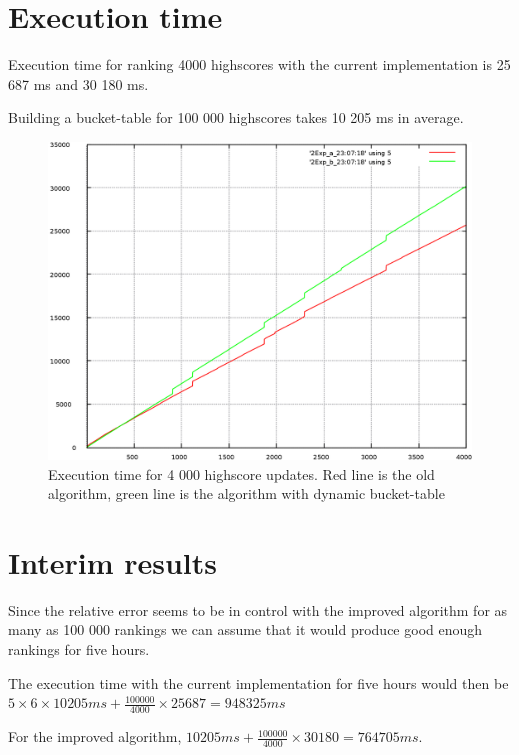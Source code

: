 \section{Execution time}

Execution time for ranking 4000 highscores with the current implementation is 25 687 ms and 30 180 ms. 

Building a bucket-table for 100 000 highscores takes 10 205 ms in average. 

\begin{figure}[h!]
  \centering
  \caption{Execution time for 4 000 highscore updates. Red line is the old algorithm, green line is the algorithm with dynamic bucket-table}
  \label{fig:relerror}
  \includegraphics[width=12cm]{img/exec-time} 
\end{figure}

\section{Interim results}

Since the relative error seems to be in control with the improved algorithm for as many as 100 000 rankings we can assume that it would produce good enough rankings for five hours.

The execution time with the current implementation for five hours would then be $5 \times 6 \times 10 205 ms + \frac{100 000}{4000} \times 25 687 = 948 325 ms$

For the improved algorithm, $10 205 ms + \frac{100 000}{4000} \times 30 180 = 764705 ms$.

